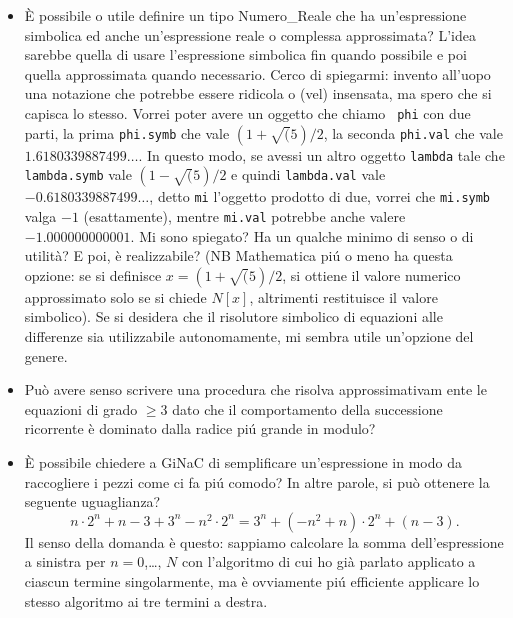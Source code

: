\documentclass{article}[12]
\begin{document}
\begin{itemize}
\item \`E possibile o utile definire un tipo Numero\_Reale che ha
un'espressione simbolica ed anche 
un'espressione reale o complessa approssimata? L'idea sarebbe quella
di usare l'espressione 
simbolica fin quando possibile e poi quella approssimata quando
necessario. Cerco di spiegarmi: 
invento all'uopo una notazione che potrebbe essere ridicola o (vel)
insensata, ma spero che 
si capisca lo stesso. Vorrei poter avere un oggetto che chiamo {\tt
phi} con due parti, la prima 
{\tt phi.symb} che vale $(1+\sqrt(5)/2$, la seconda {\tt phi.val} che
vale $1.6180339887499\dots$. 
In questo modo, se avessi un altro oggetto {\tt lambda} tale che {\tt
lambda.symb} vale 
$(1-\sqrt(5)/2$ e quindi {\tt lambda.val} vale
$-0.6180339887499\dots$, detto {\tt mi} l'oggetto 
prodotto di due, vorrei che {\tt mi.symb} valga $-1$ (esattamente),
mentre {\tt mi.val} potrebbe 
anche valere $-1.000000000001$. Mi sono spiegato? Ha un qualche minimo
di senso o di utilit\`a? 
E poi, \`e realizzabile? (NB Mathematica pi\'u o meno ha questa
opzione: se si definisce 
$x=(1+\sqrt(5)/2$, si ottiene il valore numerico approssimato solo se
si chiede $N[x]$, altrimenti 
restituisce il valore simbolico). Se si desidera che il risolutore
simbolico di equazioni alle 
differenze sia utilizzabile autonomamente, mi sembra utile un'opzione
del genere. 

\item Pu\`o avere senso scrivere una procedura che risolva
approssimativam ente le equazioni di 
grado $\ge3$ dato che il comportamento della successione ricorrente
\`e dominato dalla radice 
pi\'u grande in modulo? 

\item \`E possibile chiedere a GiNaC di semplificare un'espressione in
modo da raccogliere i pezzi 
come ci fa pi\'u comodo? In altre parole, si pu\`o ottenere la
seguente uguaglianza? 
$$
n\cdot 2^n + n - 3 + 3^n -n^2\cdot2^n
=
3^n + (-n^2+n)\cdot 2^n + (n-3).
$$
Il senso della domanda \`e questo: sappiamo calcolare la somma
dell'espressione a sinistra 
per $n=0$,\dots, $N$ con l'algoritmo di cui ho gi\`a parlato applicato
a ciascun termine 
singolarmente, ma \`e ovviamente pi\'u efficiente applicare lo stesso
algoritmo ai tre termini 
a destra. 
\end{itemize}
\end{document}
